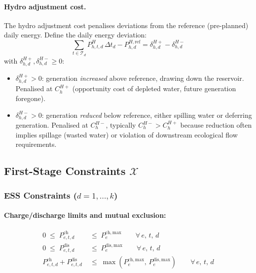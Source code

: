\documentclass[11pt]{article}
\newcommand{\Pch}{P^{\mathrm{ch}}}
\newcommand{\Pdis}{P^{\mathrm{dis}}}
\begin{document}
\paragraph{Hydro adjustment cost.}
The hydro adjustment cost penalises deviations from the reference
(pre-planned) daily energy. Define the daily energy deviation:
\begin{equation}\label{eq:hydro-dev}
  \sum_{t \in \mathcal{T}_d} P^{H}_{h,t,d}\,\Delta t_d
  - P^{H,\mathrm{ref}}_{h,d}
  = \delta^{H+}_{h,d} - \delta^{H-}_{h,d}
\end{equation}
with $\delta^{H+}_{h,d}, \delta^{H-}_{h,d} \geq 0$:
\begin{itemize}
  \item $\delta^{H+}_{h,d} > 0$: generation \emph{increased} above
        reference, drawing down the reservoir. Penalised at $C^{H+}_h$
        (opportunity cost of depleted water, future generation
        foregone).
  \item $\delta^{H-}_{h,d} > 0$: generation \emph{reduced} below
        reference, either spilling water or deferring generation.
        Penalised at $C^{H-}_h$, typically
        $C^{H-}_h > C^{H+}_h$ because reduction often implies
        spillage (wasted water) or violation of downstream ecological
        flow requirements.
\end{itemize}

\subsection{First-Stage Constraints $\mathcal{X}$}
\label{sec:s1-constraints}

\subsubsection{ESS Constraints ($d = 1,\ldots,k$)}

\paragraph{Charge/discharge limits and mutual exclusion:}
\begin{align}
  0 \;\leq\; \Pch_{e,t,d} &\;\leq\; P^{\mathrm{ch,max}}_e
    \qquad \forall\, e,\,t,\,d \label{eq:s1-ch}\\
  0 \;\leq\; \Pdis_{e,t,d} &\;\leq\; P^{\mathrm{dis,max}}_e
    \qquad \forall\, e,\,t,\,d \label{eq:s1-dis}\\
  \Pch_{e,t,d} + \Pdis_{e,t,d}
    &\;\leq\;
    \max(P^{\mathrm{ch,max}}_e,\, P^{\mathrm{dis,max}}_e)
    \qquad \forall\, e,\,t,\,d
    \label{eq:s1-excl}
\end{align}
\end{document}
